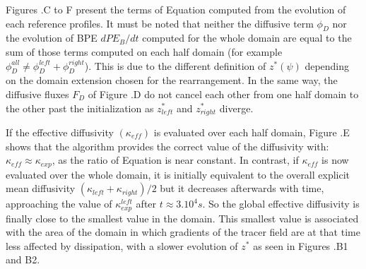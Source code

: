 Figures .C to F present the terms of Equation  computed from the evolution of each reference profiles. It must be noted that neither the diffusive term $\phi_D$ nor the evolution of BPE $dPE_B/dt$ computed for the whole domain are equal to the sum of those terms computed on each half domain (for example $\phi_D^{all} \ne \phi_D^{left}+\phi_D^{right}$). This is due to the different definition of $z^*(\psi)$ depending on the domain extension chosen for the rearrangement. In the same way, the diffusive fluxes $F_D$ of Figure .D do not cancel each other from one half domain to the other past the initialization as $z^*_{left}$ and $z^*_{right}$ diverge.

If the effective diffusivity $(\kappa_{eff})$ is evaluated over each half domain, Figure .E shows that the algorithm provides the correct value of the diffusivity with: $\kappa_{eff}\approx\kappa_{exp}$, as the ratio of Equation  is near constant. In contrast, if $\kappa_{eff}$ is now evaluated over the whole domain, it is initially equivalent to the overall explicit mean diffusivity $(\kappa_{left}+\kappa_{right})/2$ but it decreases afterwards with time, approaching the value of $\kappa_{exp}^{left}$ after $t \approx 3.10^4s$. So the global effective diffusivity is finally close to the smallest value in the domain. This smallest value is associated with the area of the domain in which gradients of the tracer field are at that time less affected by dissipation, with a slower evolution of $z^*$ as seen in Figures .B1 and B2.


